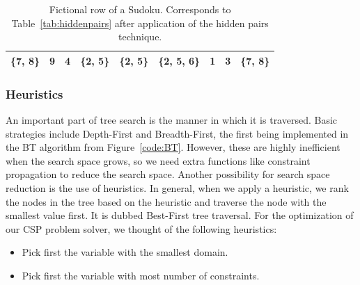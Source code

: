 \documentclass[11pt]{article} %
\begin{document}
\begin{table}[htbp]
    \caption{Fictional row of a Sudoku. Corresponds to Table~\ref{tab:hiddenpairs} after application of the hidden pairs technique.}
    \label{tab:hiddenpairs_after}
    \begin{center}
        \begin{tabular}{|c|c|c|c|c|c|c|c|c|}
        \hline
        \cellcolor[gray]{0.7}\{7, 8\} & 9 & 4 & \{2, 5\} & \{2, 5\} & \{2, 5, 6\} & 1 & 3 & \cellcolor[gray]{0.7}\{7, 8\}\\
        \hline
        \end{tabular}
    \end{center}
\end{table}

\subsubsection{Heuristics}
\label{sec:heur}
An important part of tree search is the manner in which it is traversed. Basic strategies include Depth-First and Breadth-First, the first being implemented in the BT algorithm from Figure~\ref{code:BT}. However, these are highly inefficient when the search space grows, so we need extra functions like constraint propagation to reduce the search space. Another possibility for search space reduction is the use of heuristics.
In general, when we apply a heuristic, we rank the nodes in the tree based on the heuristic and traverse the node with the smallest value first. It is dubbed Best-First tree traversal. For the optimization of our CSP problem solver, we thought of the following heuristics:

\begin{itemize}
\item Pick first the variable with the smallest domain.
\item Pick first the variable with most number of constraints.
\end{itemize}
\end{document}
